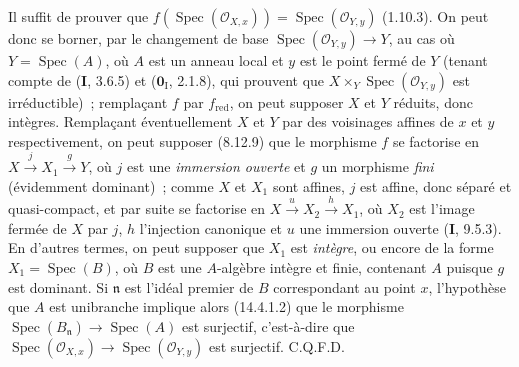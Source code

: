 Il suffit de prouver que
$f(\operatorname{Spec}(\mathcal O_{X,x}))=\operatorname{Spec}(\mathcal O_{Y,y})$
(1.10.3). On peut donc se borner, par le changement de base
$\operatorname{Spec}(\mathcal O_{Y,y})\to Y$, au cas où $Y=\operatorname{Spec}(A)$,
où $A$ est un anneau local et $y$ est le point fermé de $Y$ (tenant compte de
(\textbf{I}, 3.6.5) et ($\mathbf{0}_{\mathrm I}$, 2.1.8), qui prouvent que
$X\times_Y\operatorname{Spec}(\mathcal O_{Y,y})$ est irréductible)~; remplaçant $f$
par $f_{\mathrm{red}}$, on peut supposer $X$ et $Y$ réduits, donc intègres.
Remplaçant éventuellement $X$ et $Y$ par des voisinages affines de $x$ et $y$
respectivement, on peut supposer (8.12.9) que le morphisme $f$ se factorise en
$X\xrightarrow{j}X_1\xrightarrow{g}Y$, où $j$ est une \emph{immersion ouverte} et $g$ un
morphisme \emph{fini} (évidemment dominant)~; comme $X$ et $X_1$ sont affines, $j$
est affine, donc séparé et quasi-compact, et par suite se factorise en
$X\xrightarrow{u}X_2\xrightarrow{h}X_1$, où $X_2$ est l'image fermée de $X$ par
$j$, $h$ l'injection canonique et $u$ une immersion ouverte (\textbf{I}, 9.5.3). En d'autres
termes, on peut supposer que $X_1$ est \emph{intègre}, ou encore de la forme
$X_1=\operatorname{Spec}(B)$, où $B$ est une $A$-algèbre intègre et finie, contenant
$A$ puisque $g$ est dominant. Si $\mathfrak n$ est l'idéal premier de $B$
correspondant au point $x$, l'hypothèse que $A$ est unibranche implique alors
(14.4.1.2) que le morphisme
$\operatorname{Spec}(B_{\mathfrak n})\to\operatorname{Spec}(A)$ est surjectif,
c'est-à-dire que
$\operatorname{Spec}(\mathcal O_{X,x})\to\operatorname{Spec}(\mathcal O_{Y,y})$
est surjectif. C.Q.F.D.

